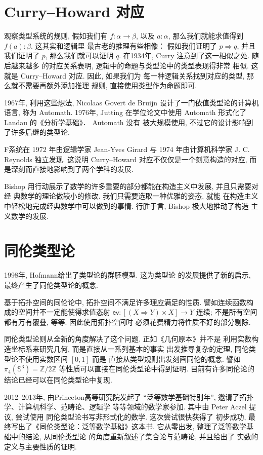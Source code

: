 \documentclass[UTF8, zihao=-4]{ctexart}
\newcommand{\cons}[1]{\textsf{#1}}
\theoremstyle{plain}
\theoremstyle{definition}
\theoremstyle{remark}
\begin{document}
\section*{Curry--Howard 对应}
观察类型系统的规则,
假如我们有 \(f : \alpha \to \beta\), 以及 \(a : \alpha\),
那么我们就能求值得到 \(f(a) : \beta\). 这其实和逻辑里
最古老的推理有些相像： 假如我们证明了 \(p\Rightarrow q\),
并且我们证明了 \(p\), 那么我们就可以证明 \(q\).
在1934年, Curry 注意到了这一相似之处. 随后越来越多
的对应关系表明, 逻辑中的命题与类型论中的类型表现得非常
相似. 这就是 Curry--Howard 对应. 因此, 如果我们为
每一种逻辑关系找到对应的类型, 那么就不需要再额外添加推理
规则, 直接使用类型作为命题即可.

1967年, 利用这些想法, Nicolaas Govert de Bruijn
设计了一门依值类型论的计算机语言, 称为 Automath.
1976年, Jutting 在学位论文中使用 Automath
形式化了 Landau 的《分析学基础》． Automath 没有
被大规模使用, 不过它的设计影响到了许多后继的类型论.

F系统在 1972 年由逻辑学家 Jean-Yves Girard
与 1974 年由计算机科学家 J. C. Reynolds 独立发现.
这说明 Curry--Howard 对应不仅仅是一个刻意构造的对应,
而是深刻而直接地影响到了两个学科的发展.

Bishop 用行动展示了数学的许多重要的部分都能在构造主义中发展, 并且只需要对经
典数学的理论做较小的修改. 我们只需要选取一种优雅的姿态, 就能
在构造主义中轻松地完成经典数学中可以做到的事情. 行胜于言, Bishop 极大地推动了构造
主义数学的发展.

\section*{同伦类型论}

1998年, Hofmann给出了类型论的群胚模型. 这为类型论
的发展提供了新的启示, 最终产生了同伦类型论的概念.

基于拓扑空间的同伦论中, 拓扑空间不满足许多理应满足的性质.
譬如连续函数构成的空间并不一定能使得求值态射
\(\cons{ev} : [(X \Rightarrow Y) \times X] \to Y\) 连续;
不是所有空间都有万有覆叠, 等等. 因此使用拓扑空间时
必须花费精力将性质不好的部分剔除.

同伦类型论则从全新的角度解决了这个问题. 正如《几何原本》并不是
利用实数构造坐标系来研究几何, 而是直接从一系列基本的事实
出发推导复杂的定理, 同伦类型论不使用实数区间 \([0,1]\) 而是
直接从类型规则出发刻画同伦的概念. 譬如
\(\pi_4(\mathbb S^3) = \mathbb Z/2\mathbb Z\)
等性质可以直接在同伦类型论中得到证明. 目前有许多同伦论的
结论已经可以在同伦类型论中复现.

2012--2013年, 由Princeton高等研究院发起了
“泛等数学基础特别年”, 邀请了拓扑学、计算机科学、范畴论、逻辑学
等等领域的数学家参加. 其中由 Peter Aczel 提议, 尝试使用
同伦类型论书写非形式化的数学. 这次尝试很快获得了
初步成功, 最终写出了《同伦类型论：泛等数学基础》这本书.
它从零出发, 整理了泛等数学基础中的结论, 从同伦类型论
的角度重新叙述了集合论与范畴论, 并且给出了
实数的定义与主要性质的证明.
\end{document}
